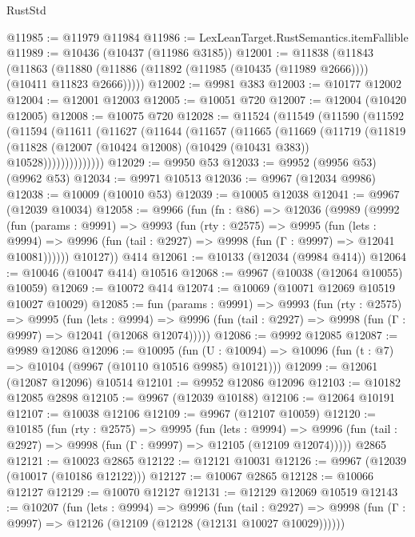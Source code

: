 \begin{lexlean}{RustStd}
\begin{coremodule}
@11985 := @11979 @11984
@11986 := LexLeanTarget.RustSemantics.itemFallible
@11989 := @10436 (@10437 (@11986 @3185))
@12001 := @11838
    (@11843
      (@11863 (@11880 (@11886 (@11892 (@11985 (@10435 (@11989 @2666)))) (@10411 @11823 @2666)))))
@12002 := @9981 @383
@12003 := @10177 @12002
@12004 := @12001 @12003
@12005 := @10051 @720
@12007 := @12004 (@10420 @12005)
@12008 := @10075 @720
@12028 := @11524
    (@11549
      (@11590
        (@11592
          (@11594
            (@11611
              (@11627
                (@11644
                  (@11657
                    (@11665
                      (@11669
                        (@11719
                          (@11819
                            (@11828
                              (@12007 (@10424 @12008) (@10429 (@10431 @383)) @10528))))))))))))))
@12029 := @9950 @53
@12033 := @9952 (@9956 @53) (@9962 @53)
@12034 := @9971 @10513
@12036 := @9967 (@12034 @9986)
@12038 := @10009 (@10010 @53)
@12039 := @10005 @12038
@12041 := @9967 (@12039 @10034)
@12058 := @9966
    (fun (fn : @86) =>
    @12036
      (@9989
        (@9992
          (fun (params : @9991) =>
          @9993
            (fun (rty : @2575) =>
            @9995
              (fun (lets : @9994) =>
              @9996 (fun (tail : @2927) => @9998 (fun (Γ : @9997) => @12041 @10081))))))
        @10127))
    @414
@12061 := @10133 (@12034 (@9984 @414))
@12064 := @10046 (@10047 @414) @10516
@12068 := @9967 (@10038 (@12064 @10055) @10059)
@12069 := @10072 @414
@12074 := @10069 (@10071 @12069 @10519 @10027 @10029)
@12085 := fun (params : @9991) =>
  @9993
    (fun (rty : @2575) =>
    @9995
      (fun (lets : @9994) =>
      @9996 (fun (tail : @2927) => @9998 (fun (Γ : @9997) => @12041 (@12068 @12074)))))
@12086 := @9992 @12085
@12087 := @9989 @12086
@12096 := @10095
    (fun (U : @10094) => @10096 (fun (t : @7) => @10104 (@9967 (@10110 @10516 @9985) @10121)))
@12099 := @12061 (@12087 @12096) @10514
@12101 := @9952 @12086 @12096
@12103 := @10182 @12085 @2898
@12105 := @9967 (@12039 @10188)
@12106 := @12064 @10191
@12107 := @10038 @12106
@12109 := @9967 (@12107 @10059)
@12120 := @10185
    (fun (rty : @2575) =>
    @9995
      (fun (lets : @9994) =>
      @9996 (fun (tail : @2927) => @9998 (fun (Γ : @9997) => @12105 (@12109 @12074)))))
    @2865
@12121 := @10023 @2865
@12122 := @12121 @10031
@12126 := @9967 (@12039 (@10017 (@10186 @12122)))
@12127 := @10067 @2865
@12128 := @10066 @12127
@12129 := @10070 @12127
@12131 := @12129 @12069 @10519
@12143 := @10207
    (fun (lets : @9994) =>
    @9996
      (fun (tail : @2927) =>
      @9998 (fun (Γ : @9997) => @12126 (@12109 (@12128 (@12131 @10027 @10029))))))

\end{coremodule}
\end{lexlean}
